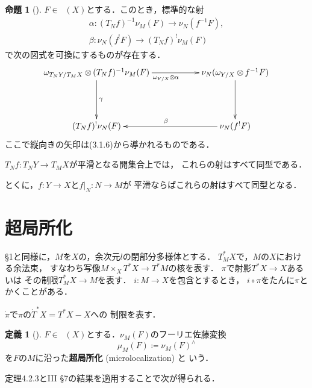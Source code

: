 \documentclass[uplatex,dvipdfmx,a4paper,10pt,draft]{jsarticle}
\theoremstyle{definition}
\numberwithin{equation}{section}
\newcommand{\Dompb}{\mathop{\mathsf{D}^\mathrm{b}}\nolimits}
\newcommand{\tens}[1][]{\mathbin{\otimes_{\raise1.5ex\hbox to-.1em{}{#1}}}}
\newcommand{\mres}[2][]{{\left.{#1}\right\rvert}_{#2}}
\theoremstyle{mystyle}
\newtheorem{mydfn}[mythm]{定義}
\newtheorem{myprp}[mythm]{命題}
\newenvironment{dfn}{\begin{dfnbox}\begin{mydfn}}{\end{mydfn}\end{dfnbox}}
\newenvironment{prp}{\begin{prpbox}\begin{myprp}}{\end{myprp}\end{prpbox}}
\begin{document}
\begin{prp}[{\cite[Prop.4.2.5]{KS90}}]
    \(F\in\Dompb(X)\)とする．このとき，標準的な射\begin{align*}
        \alpha\colon (T_{N}f)^{-1}\nu_{M}(F)\to\nu_{N}(f^{-1}F),\\
        \beta\colon \nu_{N}(f^{!}F)\to(T_{N}f)^{!}\nu_{M}(F)
    \end{align*}
    で次の図式を可換にするものが存在する．
    \[\vcenter{\xymatrix@C=56pt@R=46pt{
        \omega_{T_{N}Y/T_{M}X}\tens[](T_{N}f)^{-1}\nu_{M}(F)
        \ar[d]^{\gamma}
        \ar[r]_{\omega_{Y/X}\tens[] \alpha}
        &
        \nu_{N}(\omega_{Y/X}\tens[]{f^{-1}}F)
        \ar[d]
        \\
        (T_{N}f)^{!}\nu_{N}(F)
        &
        \nu_{N}({f^{!}}F)
        \ar[l]_{\beta}
    }}\]
    ここで縦向きの矢印は(3.1.6)から導かれるものである．

    \(T_{N}f\colon T_{N}Y\to T_{M}X\)が平滑となる開集合上では，
    これらの射はすべて同型である．

    とくに，\(f\colon Y\to X\)と\(\mres[f]{N}\colon N\to M\)が
    平滑ならばこれらの射はすべて同型となる．
\end{prp}



\section{超局所化{\cite[\S 4.3]{KS90}}}

\S1と同様に，\(M\)を\(X\)の，余次元\(l\)の閉部分多様体とする．
\(T_{M}^{\ast}X\)で，\(M\)の\(X\)における余法束，
すなわち写像\(M\times_{X}T^{\ast}X\to T^{\ast}M\)の核を表す．
\(\pi\)で射影\(T^{\ast}X\to X\)あるいは
その制限\(T_{M}^{\ast}X\to M\)を表す．
\(i\colon M\to X\)を包含とするとき，
\(i\circ \pi\)をたんに\(\pi\)とかくことがある．

\(\dot{\pi}\)で\(\pi\)の\(\dot{T}^{\ast}X=T_{}^{\ast}X-X\)への
制限を表す．

\begin{dfn}[{\cite[Def 4.3.1]{KS90}}]
    \(F\in\Dompb(X)\)とする．\(\nu_{M}(F)\)のフーリエ佐藤変換
    \[
        \mu_{M}(F)
        \coloneqq 
        \nu_{M}(F)^{\wedge}
    \]
    を\(F\)の\(M\)に沿った\textbf{超局所化} (microlocalization) と
    いう．
\end{dfn}

定理4.2.3とIII \S7の結果を適用することで次が得られる．
\end{document}
